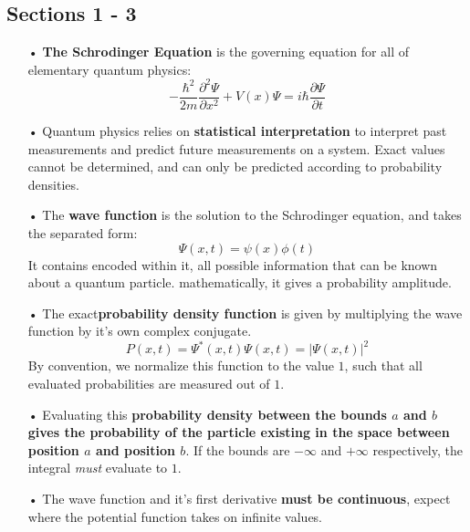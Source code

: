 \documentclass[12pt,letterpaper]{book}
\begin{document}

\subsection*{Sections 1 - 3}

\begin{enumerate}

\item[•]\textbf{The Schrodinger Equation} is the governing equation for all of elementary quantum physics:
\begin{equation}
-\frac{\hbar^2}{2m}\frac{\partial^2 \Psi}{\partial x^2} + V(x)\Psi = i\hbar\frac{\partial \Psi}{\partial t}
\end{equation}

\item[•]Quantum physics relies on \textbf{statistical interpretation} to interpret past measurements and predict future measurements on a system. Exact values cannot be determined, and can only be predicted according to probability densities.

\item[•]The \textbf{wave function} is the solution to the Schrodinger equation, and takes the separated form:
\begin{equation}
\Psi(x,t) = \psi(x)\phi(t)
\end{equation}
It contains encoded within it, all possible information that can be known about a quantum particle. mathematically, it gives a probability amplitude.

\item[•]The exact\textbf{probability density function} is given by multiplying the wave function by it's own complex conjugate.
\begin{equation}
P(x,t) = \Psi^*(x,t)\Psi(x,t) = |\Psi(x,t)|^2
\end{equation}
By convention, we normalize this function to the value $1$, such that all evaluated probabilities are measured out of $1$.

\item[•]Evaluating this \textbf{probability density between the bounds $a$ and $b$ gives the probability of the particle existing in the space between position $a$ and position $b$}. If the bounds are $-\infty$ and $+\infty$ respectively, the integral \textit{must} evaluate to $1$.

\item[•]The wave function and it's first derivative \textbf{must be continuous}, expect where the potential function takes on infinite values.


\end{enumerate}
\end{document}
